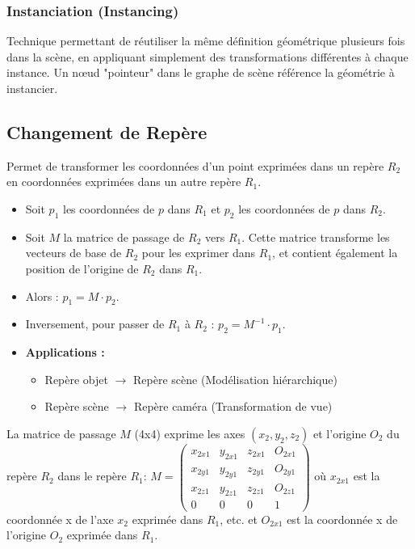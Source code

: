 \documentclass{article}
\begin{document}
\subsubsection{Instanciation (Instancing)}
Technique permettant de réutiliser la même définition géométrique plusieurs fois dans la scène, en appliquant simplement des transformations différentes à chaque instance. Un nœud "pointeur" dans le graphe de scène référence la géométrie à instancier.

\subsection{Changement de Repère}

Permet de transformer les coordonnées d'un point exprimées dans un repère $R_2$ en coordonnées exprimées dans un autre repère $R_1$.
\begin{itemize}
    \item Soit $p_1$ les coordonnées de $p$ dans $R_1$ et $p_2$ les coordonnées de $p$ dans $R_2$.
    \item Soit $M$ la matrice de passage de $R_2$ vers $R_1$. Cette matrice transforme les vecteurs de base de $R_2$ pour les exprimer dans $R_1$, et contient également la position de l'origine de $R_2$ dans $R_1$.
    \item Alors : $p_1 = M \cdot p_2$.
    \item Inversement, pour passer de $R_1$ à $R_2$ : $p_2 = M^{-1} \cdot p_1$.
    \item \textbf{Applications :}
        \begin{itemize}
            \item Repère objet $\to$ Repère scène (Modélisation hiérarchique)
            \item Repère scène $\to$ Repère caméra (Transformation de vue)
        \end{itemize}
\end{itemize}
La matrice de passage $M$ (4x4) exprime les axes $(x_2, y_2, z_2)$ et l'origine $O_2$ du repère $R_2$ dans le repère $R_1$:
$M = \begin{pmatrix} x_{2x1} & y_{2x1} & z_{2x1} & O_{2x1} \\ x_{2y1} & y_{2y1} & z_{2y1} & O_{2y1} \\ x_{2z1} & y_{2z1} & z_{2z1} & O_{2z1} \\ 0 & 0 & 0 & 1 \end{pmatrix}$
où $x_{2x1}$ est la coordonnée x de l'axe $x_2$ exprimée dans $R_1$, etc. et $O_{2x1}$ est la coordonnée x de l'origine $O_2$ exprimée dans $R_1$.
\end{document}
